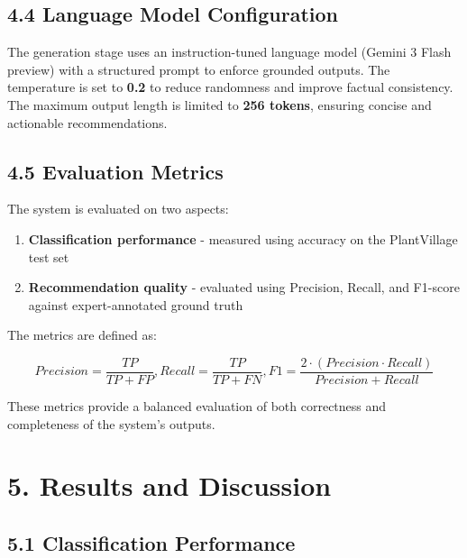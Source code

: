 \subsection*{4.4 Language Model
Configuration}\label{language-model-configuration}

The generation stage uses an instruction-tuned language model (Gemini 3
Flash preview) with a structured prompt to enforce grounded outputs. The
temperature is set to \textbf{0.2} to reduce randomness and improve
factual consistency. The maximum output length is limited to \textbf{256
tokens}, ensuring concise and actionable recommendations.

\subsection*{4.5 Evaluation Metrics}\label{evaluation-metrics}

The system is evaluated on two aspects:

\begin{enumerate}
\def\labelenumi{\arabic{enumi}.}
\item
  \textbf{Classification performance} - measured using accuracy on the
  PlantVillage test set
\item
  \textbf{Recommendation quality} - evaluated using Precision, Recall,
  and F1-score against expert-annotated ground truth
\end{enumerate}

The metrics are defined as:

\[Precision = \frac{TP}{TP + FP},Recall = \frac{TP}{TP + FN},F1 = \frac{2 \cdot (Precision \cdot Recall)}{Precision + Recall}
\]

These metrics provide a balanced evaluation of both correctness and
completeness of the system's outputs.

\section*{5. Results and Discussion}\label{results-and-discussion}

\subsection*{5.1 Classification
Performance}\label{classification-performance}

